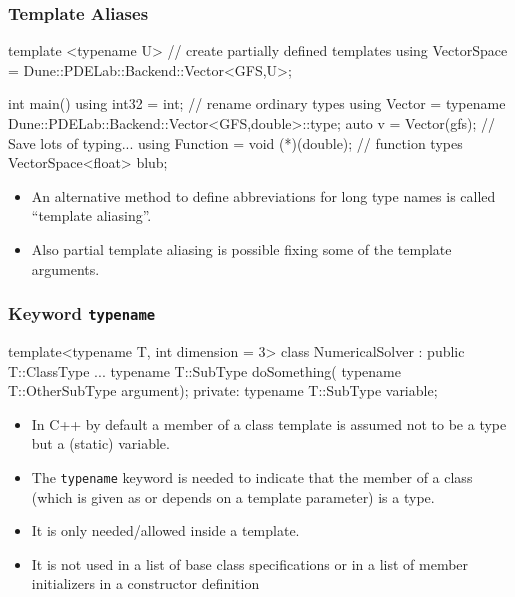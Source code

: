 \documentclass[aspectratio=169,ignorenonframetext,11pt]{beamer}
\def\inline{\lstinline[basicstyle=\small\ttfamily]}
\begin{document}
\begin{frame}[fragile]
\frametitle{Template Aliases}
\begin{cppcode}
template <typename U>    // create partially defined templates 
using VectorSpace = Dune::PDELab::Backend::Vector<GFS,U>;

int main() {
  using int32 = int;                  // rename ordinary types
  using Vector = 
        typename Dune::PDELab::Backend::Vector<GFS,double>::type;
  auto v = Vector(gfs); // Save lots of typing...
  using Function = void (*)(double);  // function types
  VectorSpace<float> blub;
}
\end{cppcode}


\begin{itemize}
\item An alternative method to define abbreviations for long type names is called ``template aliasing''.
\item Also partial template aliasing is possible fixing some of the template arguments.
\end{itemize}

\end{frame}



\begin{frame}[fragile]
\frametitle{Keyword \texttt{typename}}
\begin{cppcode}
template<typename T, int dimension = 3>
class NumericalSolver : public T::ClassType
{
    ...
    typename T::SubType doSomething(
                          typename T::OtherSubType argument);
  private:
    typename T::SubType variable;
}
\end{cppcode}
\begin{itemize}%
\item In C++ by default a member of a class template is assumed not to be a type but
a (static) variable.
\item The \inline!typename! keyword is needed to
indicate that the member of a class (which is given as or depends on a template
parameter) is a type.
\item It is only needed/allowed inside a template.
\item It is not used in a list of base class specifications or in a list of member initializers
in a constructor definition
\end{itemize}

\end{frame}
\end{document}
